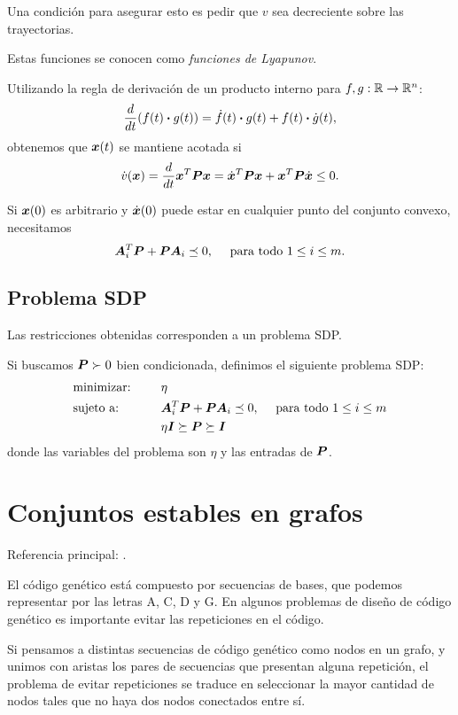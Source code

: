 Una condición para asegurar esto es pedir que $v$ sea decreciente sobre las trayectorias.

Estas funciones se conocen como \emph{funciones de Lyapunov}.

Utilizando la regla de derivación de un producto interno para $f, g: \mathbb{R} \rightarrow \mathbb{R}^n$:
$$\frac{d}{dt}(f(t) \boldsymbol{\cdot} g(t)) = \dot f(t) \boldsymbol{\cdot} g(t) + f(t) \boldsymbol{\cdot} \dot g(t),$$
obtenemos que $\bm{x}(t)$ se mantiene acotada si
$$
\dot v(\bm{x}) = \frac{d}{dt}\bm{x}^T \bm{P} \bm{x} = \dot{\bm{x}}^T \bm{P} \bm{x} +  {\bm{x}}^T \bm{P} \dot{\bm{x}} \le 0.
$$

Si $\bm{x}(0)$ es arbitrario y $\dot {\bm{x}}(0)$ puede estar en cualquier punto del conjunto convexo, necesitamos
$$
\bm{A}_i^T \bm{P} + \bm{P} \bm{A}_i \preceq 0, \quad \text{ para todo } 1 \le i \le m.
$$

\subsection {Problema SDP}

Las restricciones obtenidas corresponden a un problema SDP.

Si buscamos $\bm{P} \succ 0$ bien condicionada, definimos el siguiente problema SDP:
\begin{alignat*}{2}
  & \text{minimizar: } & & \eta \\
   & \text{sujeto a: } & \quad & \bm{A}_i^T \bm{P} + \bm{P} \bm{A}_i \preceq 0, \quad \text{ para todo } 1 \le i \le m \\
   &&& \eta \bm{I} \succeq \bm{P} \succeq \bm{I}
\end{alignat*}
donde las variables del problema son $\eta$ y las entradas de $\bm{P}$.




\section{Conjuntos estables en grafos}

Referencia principal: \cite[Sección 2.2.3]{Blekherman2013}.

El c\'odigo gen\'etico est\'a compuesto por secuencias de bases, que podemos representar por las letras A, C, D y G. En algunos problemas de diseño de código genético es importante evitar las repeticiones en el código.

Si pensamos a distintas secuencias de c\'odigo gen\'etico como nodos en un grafo, y unimos con aristas los pares de secuencias que presentan alguna repetición, el problema de evitar repeticiones se traduce en seleccionar la mayor cantidad de nodos tales que no haya dos nodos conectados entre s\'i.

